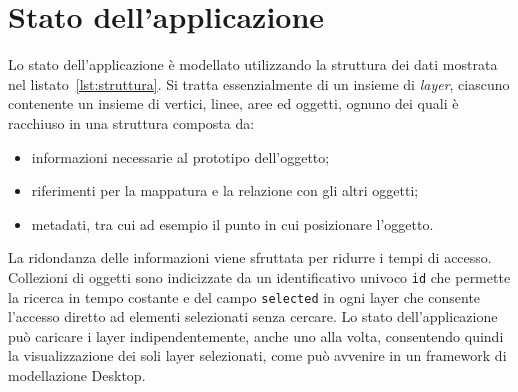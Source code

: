 \section{Stato dell'applicazione}
\label{sec:chapter_2_section_4}

Lo stato dell'applicazione è modellato utilizzando la struttura dei dati mostrata nel listato~\ref{lst:struttura}.
Si tratta essenzialmente di un insieme di \emph{layer}, ciascuno contenente un insieme di vertici, linee, aree
ed oggetti, ognuno dei quali è racchiuso in una struttura composta da:
\begin{itemize}
\item informazioni necessarie al prototipo dell'oggetto;
\item riferimenti per la mappatura e la relazione con gli altri oggetti;
\item metadati, tra cui ad esempio il punto in cui posizionare l'oggetto.
\end{itemize}

La ridondanza delle informazioni viene sfruttata per ridurre i tempi di accesso. Collezioni di oggetti
sono indicizzate da un identificativo univoco \texttt{id} che permette la ricerca in tempo costante e del
campo \texttt{selected} in ogni layer che consente l'accesso diretto ad elementi selezionati senza cercare.
Lo stato dell'applicazione può caricare i layer indipendentemente, anche uno alla volta, consentendo quindi
la visualizzazione dei soli layer selezionati, come può avvenire in un framework di modellazione Desktop.\\

\newpage



